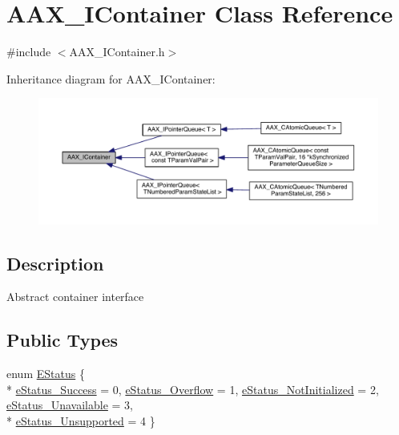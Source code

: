 \hypertarget{a00089}{}\section{A\+A\+X\+\_\+\+I\+Container Class Reference}
\label{a00089}


{\ttfamily \#include $<$A\+A\+X\+\_\+\+I\+Container.\+h$>$}



Inheritance diagram for A\+A\+X\+\_\+\+I\+Container\+:
\nopagebreak
\begin{figure}[H]
\begin{center}
\leavevmode
\includegraphics[width=350pt]{a00607}
\end{center}
\end{figure}


\subsection{Description}
Abstract container interface \subsection*{Public Types}
\begin{DoxyCompactItemize}
\item 
enum \hyperlink{a00089_aea020100f0b06636ce7cb25c2fdb0af7}{E\+Status} \{ \\*
\hyperlink{a00089_aea020100f0b06636ce7cb25c2fdb0af7add595169a28f04ed79be4f1c5974eb48}{e\+Status\+\_\+\+Success} = 0, 
\hyperlink{a00089_aea020100f0b06636ce7cb25c2fdb0af7a977319edf1a7a788eeee29dd71982f66}{e\+Status\+\_\+\+Overflow} = 1, 
\hyperlink{a00089_aea020100f0b06636ce7cb25c2fdb0af7a26ef7d5d740723455d59080b273ac217}{e\+Status\+\_\+\+Not\+Initialized} = 2, 
\hyperlink{a00089_aea020100f0b06636ce7cb25c2fdb0af7a7586eb60b4cb29ee8ed06aa7c539fe62}{e\+Status\+\_\+\+Unavailable} = 3, 
\\*
\hyperlink{a00089_aea020100f0b06636ce7cb25c2fdb0af7a1585c38bb587c4adcadefbe3823ee9f8}{e\+Status\+\_\+\+Unsupported} = 4
 \}
\end{DoxyCompactItemize}
